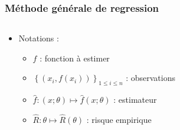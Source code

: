\documentclass[c]{beamer}
\begin{document}
\begin{frame}
  \frametitle{M\'ethode g\'en\'erale de regression}

  \begin{columns}
    \begin{column}{.6\textwidth}
      \begin{itemize}
        \item Notations :
        \begin{itemize}
          \item<1-> $f$ : fonction à estimer
          \item<2-> $\left\{ \left( x_i, f(x_i) \right) \right\}_{1 \leq i \leq n}$ : observations
          \item<3-> $\hat{f} : (x; \theta) \mapsto \hat{f}(x; \theta)$ : estimateur
          \item<4-> $\hat{R} : \theta \mapsto \hat{R}(\theta)$ : risque empirique
        \end{itemize}
      \end{itemize}
    \end{column}
    \begin{column}{.4\textwidth}
\end{column}
\end{columns}
\end{frame}
\end{document}
